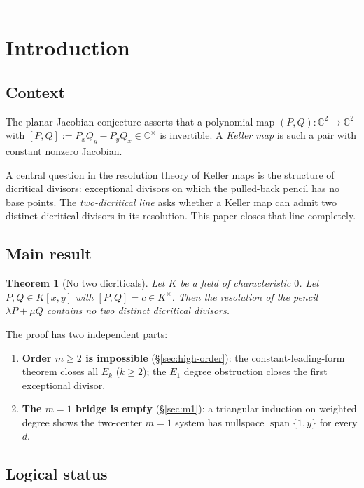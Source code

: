 \documentclass[a4paper,11pt]{article}
\theoremstyle{plain}
\newtheorem{theorem}{Theorem}[section]
\theoremstyle{definition}
\theoremstyle{remark}
\begin{document}
\vspace{1.2cm}
\hrule
\vspace{1.4cm}

\section{Introduction}

\subsection{Context}

The planar Jacobian conjecture asserts that a polynomial map $(P,Q):\mathbb{C}^2\to\mathbb{C}^2$ with $[P,Q]:=P_xQ_y-P_yQ_x\in\mathbb{C}^\times$ is invertible. A \emph{Keller map} is such a pair with constant nonzero Jacobian.

A central question in the resolution theory of Keller maps is the structure of dicritical divisors: exceptional divisors on which the pulled-back pencil has no base points. The \emph{two-dicritical line} asks whether a Keller map can admit two distinct dicritical divisors in its resolution. This paper closes that line completely.

\subsection{Main result}

\begin{theorem}[No two dicriticals]\label{thm:main}
Let $K$ be a field of characteristic $0$. Let $P,Q\in K[x,y]$ with $[P,Q]=c\in K^\times$. Then the resolution of the pencil $\lambda P+\mu Q$ contains no two distinct dicritical divisors.
\end{theorem}

The proof has two independent parts:
\begin{enumerate}[nosep]
\item \textbf{Order $m\geq 2$ is impossible} (\S\ref{sec:high-order}): the constant-leading-form theorem closes all $E_k$ ($k\geq 2$); the $E_1$ degree obstruction closes the first exceptional divisor.
\item \textbf{The $m=1$ bridge is empty} (\S\ref{sec:m1}): a triangular induction on weighted degree shows the two-center $m=1$ system has nullspace $\operatorname{span}\{1,y\}$ for every $d$.
\end{enumerate}

\subsection{Logical status}
\end{document}
